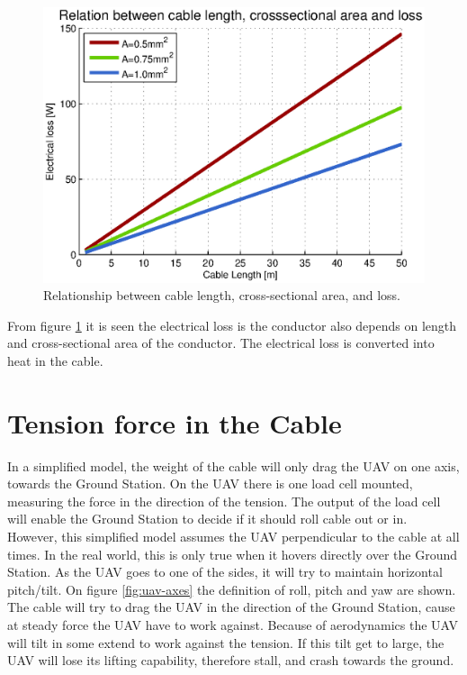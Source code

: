 \begin{figure}[hbtp]
\centering
\includegraphics[scale=1]{graphics/matlab/cable_relation_lenght_loss_crosssection.eps}
\caption[Relationship between cable length, cross-sectional area and cable loss.]{Relationship between cable length, cross-sectional area, and  loss.}
\label{fig:relationship_loss_length}
\end{figure}


\noindent
From figure \ref{fig:relationship_loss_length} it is seen the electrical loss is the conductor also depends on length and cross-sectional area of the conductor. The electrical loss is converted into heat in the cable.


\section{Tension force in the Cable}

\noindent
In a simplified model, the weight of the cable will only drag the UAV on one axis, towards the Ground Station. On the UAV there is one load cell mounted, measuring the force in the direction of the tension. The output of the load cell will enable the Ground Station to decide if it should roll cable out or in. However, this simplified model assumes the UAV perpendicular to the cable at all times. 
In the real world, this is only true when it hovers directly over the Ground Station. As the UAV goes to one of the sides, it will try to maintain horizontal pitch/tilt. On figure \ref{fig:uav-axes} the definition of roll, pitch and yaw are shown. The cable will try to drag the UAV in the direction of the Ground Station, cause at steady force the UAV have to work against. Because of aerodynamics the UAV will tilt in some extend to work against the tension. If this tilt get to large, the UAV will lose its lifting capability, therefore stall, and crash towards the ground.


